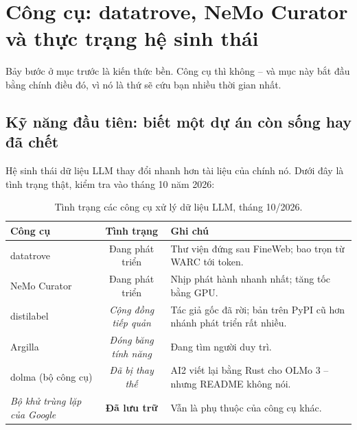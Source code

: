 
\section{Công cụ: datatrove, NeMo Curator và thực trạng hệ sinh thái}
\label{sec:data_tools}

Bảy bước ở mục trước là kiến thức bền. Công cụ thì không -- và mục này bắt đầu bằng chính điều đó, vì nó là thứ sẽ cứu bạn nhiều thời gian nhất.

\subsection{Kỹ năng đầu tiên: biết một dự án còn sống hay đã chết}
\label{ssec:tool_liveness}

Hệ sinh thái dữ liệu LLM thay đổi nhanh hơn tài liệu của chính nó. Dưới đây là tình trạng thật, kiểm tra vào tháng 10 năm 2026:

\begin{table}[H]
\centering
\small
\begin{tabularx}{\textwidth}{@{}lcX@{}}
\toprule
\textbf{Công cụ} & \textbf{Tình trạng} & \textbf{Ghi chú} \\
\midrule
datatrove & Đang phát triển & Thư viện đứng sau FineWeb; bao trọn từ WARC tới token. \\
NeMo Curator & Đang phát triển & Nhịp phát hành nhanh nhất; tăng tốc bằng GPU. \\
distilabel & \textit{Cộng đồng tiếp quản} & Tác giả gốc đã rời; bản trên PyPI cũ hơn nhánh phát triển rất nhiều. \\
Argilla & \textit{Đóng băng tính năng} & Đang tìm người duy trì. \\
dolma (bộ công cụ) & \textit{Đã bị thay thế} & AI2 viết lại bằng Rust cho OLMo 3 -- nhưng README không nói. \\
\textit{Bộ khử trùng lặp của Google} & \textbf{Đã lưu trữ} & Vẫn là phụ thuộc của công cụ khác. \\
\bottomrule
\end{tabularx}
\caption{Tình trạng các công cụ xử lý dữ liệu LLM, tháng 10/2026.}
\label{tab:data_tools_status}
\end{table}

